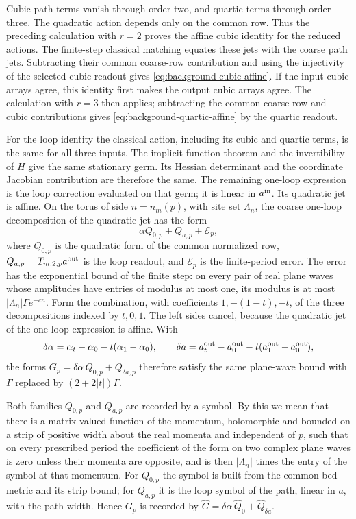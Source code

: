 Cubic path terms vanish through order two, and quartic terms
through order three. The quadratic action depends only on the
common row. Thus the preceding calculation with $r=2$ proves
the affine cubic identity for the reduced actions. The finite-step
classical matching equates these jets with the coarse path jets.
Subtracting their common coarse-row contribution and using the
injectivity of the selected cubic readout gives
\eqref{eq:background-cubic-affine}. If the input cubic arrays
agree, this identity first makes the output cubic arrays agree.
The calculation with $r=3$ then applies; subtracting the common
coarse-row and cubic contributions gives
\eqref{eq:background-quartic-affine} by the quartic readout.

For the loop identity the classical action, including its cubic
and quartic terms, is the same for all three inputs. The implicit
function theorem and the invertibility of $H$ give the same
stationary germ. Its Hessian determinant and the coordinate
Jacobian contribution are therefore the same. The remaining
one-loop expression is the loop correction evaluated on that
germ; it is linear in $a^{\rm in}$. Its quadratic jet is affine.
On the torus of side $n=n_m(p)$, with site set $\Lambda_n$, the
coarse one-loop decomposition of the quadratic jet has the form
\[
                    \alpha Q_{0,p}+Q_{a,p}+\mathcal E_p,
\]
where $Q_{0,p}$ is the quadratic form of the common normalized row,
$Q_{a,p}=T_{m,2,p}a^{\rm out}$ is the loop readout, and
$\mathcal E_p$ is the finite-period error. The error has the
exponential bound of the finite step: on every pair of real plane
waves whose amplitudes have entries of modulus at most one, its
modulus is at most $|\Lambda_n|\Gamma e^{-cn}$. Form the
combination, with coefficients $1,-(1-t),-t$, of the three
decompositions indexed by $t,0,1$. The left sides cancel, because
the quadratic jet of the one-loop expression is affine. With
\[
 \delta\alpha=\alpha_t-\alpha_0-t(\alpha_1-\alpha_0),\qquad
 \delta a=a^{\rm out}_t-a^{\rm out}_0-t(a^{\rm out}_1-a^{\rm out}_0),
\]
the forms $G_p=\delta\alpha\,Q_{0,p}+Q_{\delta a,p}$ therefore
satisfy the same plane-wave bound with $\Gamma$ replaced by
$(2+2|t|)\Gamma$.

Both families $Q_{0,p}$ and $Q_{a,p}$ are recorded by a symbol. By
this we mean that there is a matrix-valued function of the momentum,
holomorphic and bounded on a strip of positive width about the real
momenta and independent of $p$, such that on every prescribed period
the coefficient of the form on two complex plane waves is zero unless
their momenta are opposite, and is then $|\Lambda_n|$ times the entry
of the symbol at that momentum. For $Q_{0,p}$ the symbol is built
from the common bed metric and its strip bound; for $Q_{a,p}$ it is
the loop symbol of the path, linear in $a$, with the path width.
Hence $G_p$ is recorded by
$\widehat G=\delta\alpha\,\widehat Q_0+\widehat Q_{\delta a}$.

